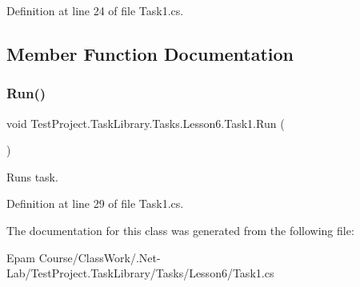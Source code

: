 Definition at line 24 of file Task1.\+cs.



\subsection{Member Function Documentation}
\mbox{\label{class_test_project_1_1_task_library_1_1_tasks_1_1_lesson6_1_1_task1_a202ebb10a00bab473580af0b1ee5d4ae}} 
\subsubsection{\texorpdfstring{Run()}{Run()}}
{\footnotesize\ttfamily void Test\+Project.\+Task\+Library.\+Tasks.\+Lesson6.\+Task1.\+Run (\begin{DoxyParamCaption}{ }\end{DoxyParamCaption})}



Runs task. 



Definition at line 29 of file Task1.\+cs.



The documentation for this class was generated from the following file\+:\begin{DoxyCompactItemize}
\item 
Epam Course/\+Class\+Work/.\+Net-\/\+Lab/\+Test\+Project.\+Task\+Library/\+Tasks/\+Lesson6/Task1.\+cs\end{DoxyCompactItemize}
